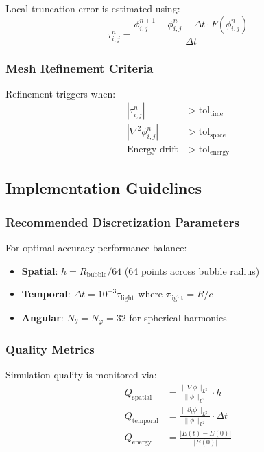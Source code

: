 Local truncation error is estimated using:
\begin{equation}
\tau_{i,j}^n = \frac{\phi_{i,j}^{n+1} - \phi_{i,j}^n - \Delta t \cdot F(\phi_{i,j}^n)}{\Delta t}
\end{equation}

\subsubsection{Mesh Refinement Criteria}

Refinement triggers when:
\begin{align}
|\tau_{i,j}^n| &> \text{tol}_{\text{time}} \\
|\nabla^2 \phi_{i,j}^n| &> \text{tol}_{\text{space}} \\
\text{Energy drift} &> \text{tol}_{\text{energy}}
\end{align}

\subsection{Implementation Guidelines}

\subsubsection{Recommended Discretization Parameters}

For optimal accuracy-performance balance:
\begin{itemize}
\item \textbf{Spatial}: $h = R_{\text{bubble}}/64$ (64 points across bubble radius)
\item \textbf{Temporal}: $\Delta t = 10^{-3} \tau_{\text{light}}$ where $\tau_{\text{light}} = R/c$
\item \textbf{Angular}: $N_{\theta} = N_{\varphi} = 32$ for spherical harmonics
\end{itemize}

\subsubsection{Quality Metrics}

Simulation quality is monitored via:
\begin{align}
Q_{\text{spatial}} &= \frac{\|\nabla \phi\|_{L^2}}{\|\phi\|_{L^2}} \cdot h \\
Q_{\text{temporal}} &= \frac{\|\partial_t \phi\|_{L^2}}{\|\phi\|_{L^2}} \cdot \Delta t \\
Q_{\text{energy}} &= \frac{|E(t) - E(0)|}{|E(0)|}
\end{align}

